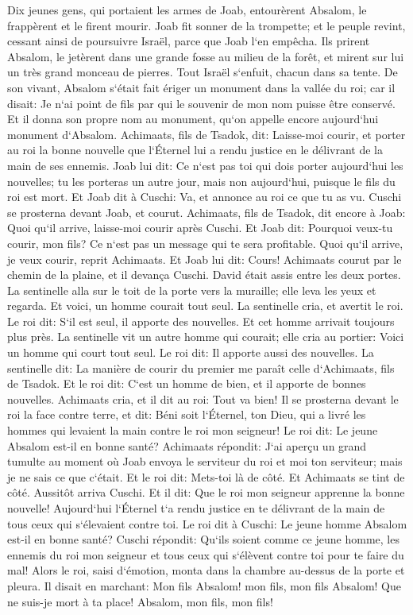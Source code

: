 \verse Dix jeunes gens, qui portaient les armes de Joab, entourèrent Absalom, le frappèrent et le firent mourir. 
\verse Joab fit sonner de la trompette; et le peuple revint, cessant ainsi de poursuivre Israël, parce que Joab l`en empêcha. 
\verse Ils prirent Absalom, le jetèrent dans une grande fosse au milieu de la forêt, et mirent sur lui un très grand monceau de pierres. Tout Israël s`enfuit, chacun dans sa tente. 
\verse De son vivant, Absalom s`était fait ériger un monument dans la vallée du roi; car il disait: Je n`ai point de fils par qui le souvenir de mon nom puisse être conservé. Et il donna son propre nom au monument, qu`on appelle encore aujourd`hui monument d`Absalom. 
\verse Achimaats, fils de Tsadok, dit: Laisse-moi courir, et porter au roi la bonne nouvelle que l`Éternel lui a rendu justice en le délivrant de la main de ses ennemis. 
\verse Joab lui dit: Ce n`est pas toi qui dois porter aujourd`hui les nouvelles; tu les porteras un autre jour, mais non aujourd`hui, puisque le fils du roi est mort. 
\verse Et Joab dit à Cuschi: Va, et annonce au roi ce que tu as vu. Cuschi se prosterna devant Joab, et courut. 
\verse Achimaats, fils de Tsadok, dit encore à Joab: Quoi qu`il arrive, laisse-moi courir après Cuschi. Et Joab dit: Pourquoi veux-tu courir, mon fils? Ce n`est pas un message qui te sera profitable. 
\verse Quoi qu`il arrive, je veux courir, reprit Achimaats. Et Joab lui dit: Cours! Achimaats courut par le chemin de la plaine, et il devança Cuschi. 
\verse David était assis entre les deux portes. La sentinelle alla sur le toit de la porte vers la muraille; elle leva les yeux et regarda. Et voici, un homme courait tout seul. 
\verse La sentinelle cria, et avertit le roi. Le roi dit: S`il est seul, il apporte des nouvelles. Et cet homme arrivait toujours plus près. 
\verse La sentinelle vit un autre homme qui courait; elle cria au portier: Voici un homme qui court tout seul. Le roi dit: Il apporte aussi des nouvelles. 
\verse La sentinelle dit: La manière de courir du premier me paraît celle d`Achimaats, fils de Tsadok. Et le roi dit: C`est un homme de bien, et il apporte de bonnes nouvelles. 
\verse Achimaats cria, et il dit au roi: Tout va bien! Il se prosterna devant le roi la face contre terre, et dit: Béni soit l`Éternel, ton Dieu, qui a livré les hommes qui levaient la main contre le roi mon seigneur! 
\verse Le roi dit: Le jeune Absalom est-il en bonne santé? Achimaats répondit: J`ai aperçu un grand tumulte au moment où Joab envoya le serviteur du roi et moi ton serviteur; mais je ne sais ce que c`était. 
\verse Et le roi dit: Mets-toi là de côté. Et Achimaats se tint de côté. 
\verse Aussitôt arriva Cuschi. Et il dit: Que le roi mon seigneur apprenne la bonne nouvelle! Aujourd`hui l`Éternel t`a rendu justice en te délivrant de la main de tous ceux qui s`élevaient contre toi. 
\verse Le roi dit à Cuschi: Le jeune homme Absalom est-il en bonne santé? Cuschi répondit: Qu`ils soient comme ce jeune homme, les ennemis du roi mon seigneur et tous ceux qui s`élèvent contre toi pour te faire du mal! 
\verse Alors le roi, saisi d`émotion, monta dans la chambre au-dessus de la porte et pleura. Il disait en marchant: Mon fils Absalom! mon fils, mon fils Absalom! Que ne suis-je mort à ta place! Absalom, mon fils, mon fils! 

